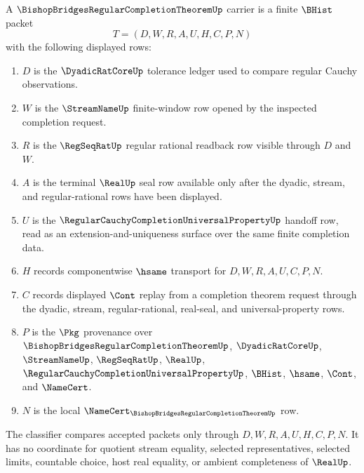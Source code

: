 \begin{definition}
\label{def:bishop-bridges-regular-completion-theorem-carrier}
A $\BishopBridgesRegularCompletionTheoremUp$ carrier is a finite $\BHist$ packet
$$
T=(D,W,R,A,U,H,C,P,N)
$$
with the following displayed rows:
\begin{enumerate}
\item $D$ is the $\DyadicRatCoreUp$ tolerance ledger used to compare regular Cauchy observations.
\item $W$ is the $\StreamNameUp$ finite-window row opened by the inspected completion request.
\item $R$ is the $\RegSeqRatUp$ regular rational readback row visible through $D$ and $W$.
\item $A$ is the terminal $\RealUp$ seal row available only after the dyadic, stream, and regular-rational rows have been displayed.
\item $U$ is the $\RegularCauchyCompletionUniversalPropertyUp$ handoff row, read as an extension-and-uniqueness surface over the same finite completion data.
\item $H$ records componentwise $\hsame$ transport for $D,W,R,A,U,C,P,N$.
\item $C$ records displayed $\Cont$ replay from a completion theorem request through the dyadic, stream, regular-rational, real-seal, and universal-property rows.
\item $P$ is the $\Pkg$ provenance over $\BishopBridgesRegularCompletionTheoremUp$, $\DyadicRatCoreUp$, $\StreamNameUp$, $\RegSeqRatUp$, $\RealUp$, $\RegularCauchyCompletionUniversalPropertyUp$, $\BHist$, $\hsame$, $\Cont$, and $\NameCert$.
\item $N$ is the local $\NameCert_{\BishopBridgesRegularCompletionTheoremUp}$ row.
\end{enumerate}
The classifier compares accepted packets only through $D,W,R,A,U,H,C,P,N$. It has no coordinate for quotient stream equality, selected representatives, selected limits, countable choice, host real equality, or ambient completeness of $\RealUp$.
\end{definition}

